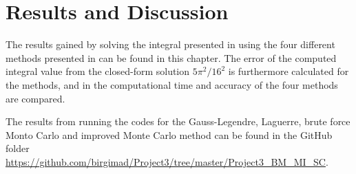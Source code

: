 \chapter{Results and Discussion}
\label{chap:Results}
The results gained by solving the integral presented in  using the four different methods presented in  can be found in this chapter. 
The error of the computed integral value from the closed-form solution $5\pi ^2 / 16^2$ is furthermore calculated for the methods, and in  the computational time and accuracy of the four methods are compared.  

The results from running the codes for the Gauss-Legendre, Laguerre, brute force Monto Carlo and improved Monte Carlo method can be found in the GitHub folder  \url{https://github.com/birgimad/Project3/tree/master/Project3_BM_MI_SC}.